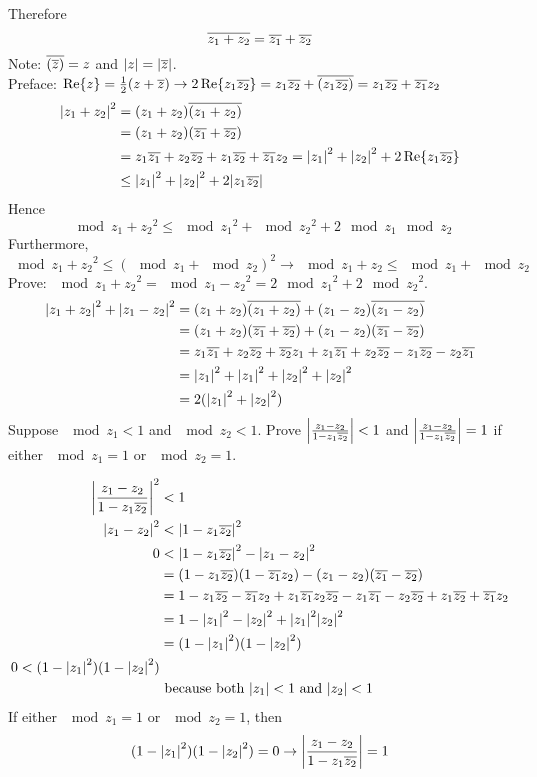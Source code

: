 \documentclass[12pt]{article}
\begin{document}
Therefore $$ \overline{z_1 + z_2} = \overline{z_1} + \overline{z_2}$$ 
Note: $\overline{(\overline{z})} = z$ and $\abs{z} = \abs{\overline{z}}$. \\
Preface: $\Re{z} = \frac{1}{2}(z + \overline{z}) \to 2\Re{z_1\overline{z_2}} = z_1\overline{z_2} + \overline{(z_1\overline{z_2})} = z_1\overline{z_2} + \overline{z_1}z_2$
$$ \begin{aligned} \abs{z_1 + z_2}^2 &= (z_1 + z_2)\overline{(z_1 + z_2)} \\ &= (z_1 + z_2)(\overline{z_1} + \overline{z_2}) \\ &= z_1\overline{z_1} + z_2\overline{z_2} + z_1\overline{z_2} + \overline{z_1}z_2 = \abs{z_1}^2 + \abs{z_2}^2 + 2\Re{z_1\overline{z_2}} \\ &\leq \abs{z_1}^2 + \abs{z_2}^2 + 2\abs{z_1\overline{z_2}} \end{aligned} $$ 
Hence $$ \mod{z_1 + z_2}^2 \leq \mod{z_1}^2 + \mod{z_2}^2 + 2\mod{z_1}\mod{z_2} $$ 
Furthermore, $$ \mod{z_1 + z_2}^2 \leq (\mod{z_1} + \mod{z_2})^2 \to \mod{z_1 + z_2} \leq \mod{z_1} + \mod{z_2}$$ 
Prove: $\mod{z_1 + z_2}^2 = \mod{z_1 - z_2}^2 = 2\mod{z_1}^2 + 2\mod{z_2}^2$. 
$$ \begin{aligned} \abs{z_1 + z_2}^2 + \abs{z_1 - z_2}^2 &= (z_1 + z_2)\overline{(z_1 + z_2)} + (z_1 - z_2)\overline{(z_1 - z_2)} \\ &= (z_1 + z_2)(\overline{z_1} + \overline{z_2}) + (z_1 - z_2)(\overline{z_1} - \overline{z_2}) \\ &= z_1\overline{z_1} + z_2\overline{z_2} + \overline{z_2}z_1 + z_1\overline{z_1} + z_2\overline{z_2} -z_1\overline{z_2} - z_2\overline{z_1} \\ &= \abs{z_1}^2 + \abs{z_1}^2 + \abs{z_2}^2 + \abs{z_2}^2 \\ &= 2(\abs{z_1}^2 + \abs{z_2}^2) \end{aligned} $$ 
Suppose $\mod{z_1} < 1$ and $\mod{z_2} < 1$. Prove $\abs{\frac{z_1 - z_2}{1 - z_1\overline{z_2}}} < 1$ and $\abs{\frac{z_1 - z_2}{1 - z_1\overline{z_2}}} = 1$ if either $\mod{z_1} = 1$ or $\mod{z_2} = 1$. 

$$ \begin{aligned} \abs{\frac{z_1 - z_2}{1 - z_1\overline{z_2}}}^2 &< 1 \\
 \abs{z_1 - z_2}^2 &< \abs{1 - z_1\overline{z_2}}^2 \\
  0 &< \abs{1 - z_1\overline{z_2}}^2 - \abs{z_1 - z_2}^2 \\
   &= (1 - z_1\overline{z_2})(1 - \overline{z_1}z_2) - (z_1 - z_2)(\overline{z_1} - \overline{z_2}) \\
    &= 1 - z_1\overline{z_2} - \overline{z_1}z_2 + z_1\overline{z_1}z_2\overline{z_2} - z_1\overline{z_1} - z_2\overline{z_2} + z_1\overline{z_2} + \overline{z_1}z_2 \\
     &= 1 - \abs{z_1}^2 - \abs{z_2}^2 + \abs{z_1}^2\abs{z_2}^2 \\
     &= (1 - \abs{z_1}^2)(1 - \abs{z_2}^2) \\
      0 < (1 - \abs{z_1}^2)(1 - \abs{z_2}^2) \\ &\text{ because both } \abs{z_1} < 1 \text{ and } \abs{z_2} < 1 \end{aligned} $$ 
If either $\mod{z_1} = 1$ or $\mod{z_2} = 1$, then 
$$ (1 - \abs{z_1}^2)(1 - \abs{z_2}^2) = 0 \to \abs{\frac{z_1 - z_2}{1 - z_1\overline{z_2}}} = 1 $$ 
\end{document}
